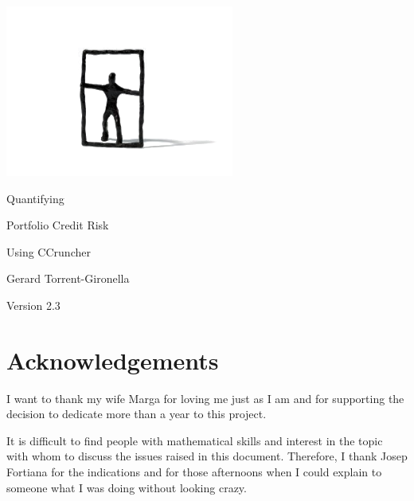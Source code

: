 \documentclass[11pt,fleqn]{book} %
\def\numversion{2.3}
\begin{document}
\begingroup
\thispagestyle{empty}
\vspace*{-2.5cm}
\centerline{\includegraphics[angle=0]{./Pictures/logo.png}}
\centering
\vspace*{0.5cm}
\par\normalfont\fontsize{35}{55}\sffamily\selectfont
Quantifying\par 
Portfolio Credit Risk\par
Using CCruncher\par
\vspace*{2cm}
{\huge Gerard Torrent-Gironella}\par
\vspace*{2cm}
\par\normalfont\fontsize{14}{14}\sffamily\selectfont
Version \numversion\par
\endgroup


\newpage

\section*{Acknowledgements}
I want to thank my wife Marga for loving me just as I am and for supporting 
the decision to dedicate more than a year to this project.

It is difficult to find people with mathematical skills and interest in the 
topic with whom to discuss the issues raised in this document. Therefore, 
I thank Josep Fortiana for the indications and for those afternoons when I 
could explain to someone what I was doing without looking crazy.
\end{document}
